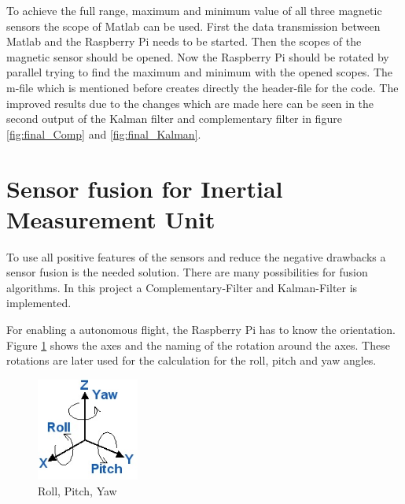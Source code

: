 To achieve the full range, maximum and minimum value of all three magnetic sensors the scope of Matlab can be used. First the data transmission between Matlab and the Raspberry Pi needs to be started. Then the scopes of the magnetic sensor should be opened. Now the Raspberry Pi should be rotated by parallel trying to find the maximum and minimum with the opened scopes. The m-file which is mentioned before creates directly the header-file for the code. The improved results due to the changes which are made here can be seen in the second output of the Kalman filter and complementary filter in figure \ref{fig:final_Comp} and \ref{fig:final_Kalman}.



\section{Sensor fusion for Inertial Measurement Unit}
\label{sec:Sensor fusion for Inertial Measurement Unit}


To use all positive features of the sensors and reduce the negative drawbacks a sensor fusion is the needed solution. There are many possibilities for fusion algorithms. In this project a Complementary-Filter and Kalman-Filter is implemented.

For enabling a autonomous flight, the Raspberry Pi has to know the orientation. Figure \ref{fig:angles} shows the axes and the naming of the rotation around the axes. These rotations are later used for the calculation for the roll, pitch and yaw angles.

\begin{figure}[H]
	\centering\includegraphics[width=0.3\textwidth]{fig/Kal_Comp/Roll_pitch_yaw}
	\caption{Roll, Pitch, Yaw \cite{doc:boreg}}
	\label{fig:angles}
\end{figure}


